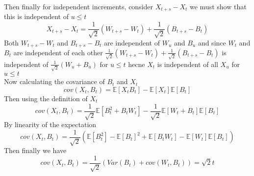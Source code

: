 \documentclass{article}
\begin{document}
Then finally for independent increments, consider $X_{t+s} - X_t$ we must show
that this is independent of $u\leq t$
\begin{equation*} 
    X_{t+s} - X_t = \frac{1}{\sqrt2} (W_{t+s} - W_t) + \frac{1}{\sqrt2}(B_{t+s} - B_t)   
\end{equation*} 
Both $W_{t+s} - W_t$ and $B_{t+s} - B_t$ are independent of $W_u$ and $B_u$ and since $W_t$ and $B_t$ are independent of each other 
$ \frac{1}{\sqrt2} (W_{t+s} - W_t) + \frac{1}{\sqrt2}(B_{t+s} - B_t)$ is independent of $\frac{1}{\sqrt2} (W_u + B_u)$ for $u\leq t$
hecne $X_t$ is independent of all $X_u$ for $u\leq t$
\\Now calculating the covariance of $B_t$ and $X_t$
\begin{equation*} 
    cov(X_t, B_t) = \mathbb{E}[X_t B_t] - \mathbb{E}[X_t]\mathbb{E}[B_t] 
\end{equation*}   
Then using the definition of $X_t$
\begin{equation*} 
    cov(X_t, B_t) = \frac{1}{\sqrt2}\mathbb{E}[B_t^2 + B_t W_t]-\frac{1}{\sqrt2}\mathbb{E}[W_t+B_t]\mathbb{E}[B_t]    
\end{equation*}
By linearity of the expectation
\begin{equation*} 
        cov(X_t, B_t) = \frac{1}{\sqrt2} (\mathbb{E}[B_t^2]-\mathbb{E}[B_t]^2 +\mathbb{E}[B_tW_t] - \mathbb{E}[W_t]\mathbb{E}[B_t])
\end{equation*} 
Then finally we have
\begin{equation*} 
   cov(X_t, B_t) = \frac{1}{\sqrt2} (Var(B_t) + cov(W_t,B_t)) = \sqrt2 t 
\end{equation*}
\end{document}
